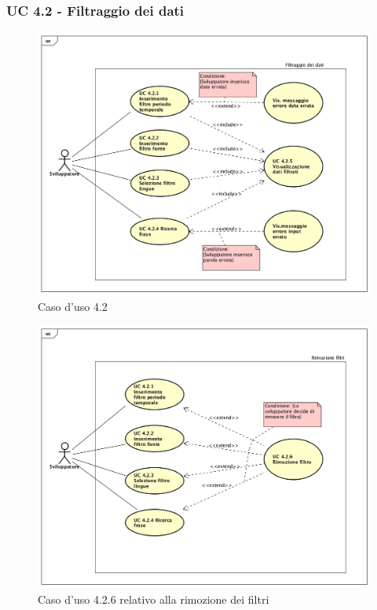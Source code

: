 \subsubsection{UC 4.2 - Filtraggio dei dati}
\begin{figure}[H]
\centering
\includegraphics[width=17cm]{img/UC420.png} 
\caption{Caso d'uso 4.2}\label{fig:420}
\end{figure}
\begin{figure}[H]
\centering
\includegraphics[width=17cm]{img/UC426.png} 
\caption{Caso d'uso 4.2.6 relativo alla rimozione dei filtri}\label{fig:426}
\end{figure}
